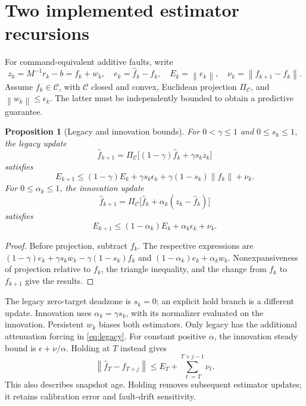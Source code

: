 \documentclass[11pt]{article}
\newtheorem{proposition}{Proposition}
\newcommand{\norm}[1]{\left\lVert#1\right\rVert}
\begin{document}
\section{Two implemented estimator recursions}
For command-equivalent additive faults, write
\[
 z_k=M^{-1}r_k-b=f_k+w_k,\quad e_k=\hat f_k-f_k,\quad E_k=\norm{e_k},
 \quad \nu_k=\norm{f_{k+1}-f_k}.
\]
Assume $f_k\in\mathcal C$, with $\mathcal C$ closed and convex, Euclidean
projection $\Pi_{\mathcal C}$, and $\norm{w_k}\le\epsilon_k$.
The latter must be independently bounded to obtain a predictive guarantee.

\begin{proposition}[Legacy and innovation bounds]
For $0<\gamma\le1$ and $0\le s_k\le1$, the legacy update
\[
\hat f_{k+1}=\Pi_{\mathcal C}
\big[(1-\gamma)\hat f_k+\gamma s_kz_k\big]
\]
satisfies
\begin{equation}
E_{k+1}\le(1-\gamma)E_k+\gamma s_k\epsilon_k+
              \gamma(1-s_k)\norm{f_k}+\nu_k.
\label{eq:legacy}
\end{equation}
For $0\le\alpha_k\le1$, the innovation update
\[
\hat f_{k+1}=\Pi_{\mathcal C}
\big[\hat f_k+\alpha_k(z_k-\hat f_k)\big]
\]
satisfies
\begin{equation}
E_{k+1}\le(1-\alpha_k)E_k+\alpha_k\epsilon_k+\nu_k.
\label{eq:innovation}
\end{equation}
\end{proposition}
\begin{proof}
Before projection, subtract $f_k$. The respective expressions are
$(1-\gamma)e_k+\gamma s_kw_k-\gamma(1-s_k)f_k$ and
$(1-\alpha_k)e_k+\alpha_kw_k$.
Nonexpansiveness of projection relative to $f_k$, the triangle inequality,
and the change from $f_k$ to $f_{k+1}$ give the results.
\end{proof}
The legacy zero-target deadzone is $s_k=0$; an explicit hold branch is a
different update. Innovation uses $\alpha_k=\gamma s_k$, with its normalizer
evaluated on the innovation. Persistent $w_k$ biases both estimators.
Only legacy has the additional attenuation forcing in
\eqref{eq:legacy}. For constant positive $\alpha$, the innovation steady
bound is $\epsilon+\nu/\alpha$.
Holding at $T$ instead gives
\begin{equation}
\norm{\hat f_T-f_{T+j}}\le E_T+
      \sum_{\ell=T}^{T+j-1}\nu_\ell.
\label{eq:hold}
\end{equation}
This also describes snapshot age. Holding removes subsequent estimator
updates; it retains calibration error and fault-drift sensitivity.
\end{document}
